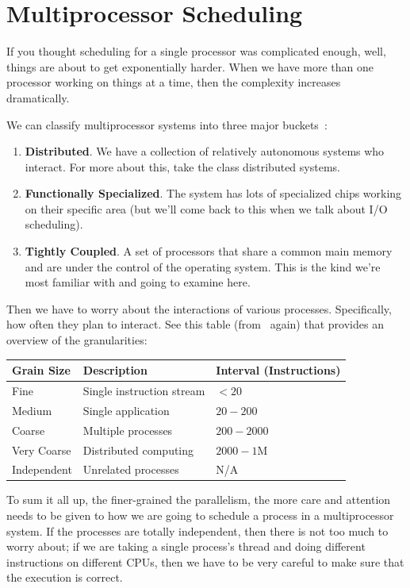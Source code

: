 \section*{Multiprocessor Scheduling}
If you thought scheduling for a single processor was complicated enough, well, things are about to get exponentially harder. When we have more than one processor working on things at a time, then the complexity increases dramatically. 

We can classify multiprocessor systems into three major buckets~\cite{osi}:

\begin{enumerate}
	\item \textbf{Distributed}. We have a collection of relatively autonomous systems who interact. For more about this, take the class distributed systems.
	\item \textbf{Functionally Specialized}. The system has lots of specialized chips working on their specific area (but we'll come back to this when we talk about I/O scheduling).
	\item \textbf{Tightly Coupled}. A set of processors that share a common main memory and are under the control of the operating system. This is the kind we're most familiar with and going to examine here.
\end{enumerate}

Then we have to worry about the interactions of various processes. Specifically, how often they plan to interact. See this table (from~\cite{osi} again) that provides an overview of the granularities:

\begin{center}
\begin{tabular}{l|l|l}
	\textbf{Grain Size} & \textbf{Description} & \textbf{Interval (Instructions)}\\ \hline
	Fine & Single instruction stream & $< 20$ \\\hline
	Medium & Single application & $20 - 200$ \\\hline
	Coarse & Multiple processes & $200 - 2000$ \\\hline
	Very Coarse & Distributed computing & $2000 - 1$M \\\hline
	Independent & Unrelated processes & N/A \\

\end{tabular}
\end{center}

To sum it all up, the finer-grained the parallelism, the more care and attention needs to be given to how we are going to schedule a process in a multiprocessor system. If the processes are totally independent, then there is not too much to worry about; if we are taking a single process's thread and doing different instructions on different CPUs, then we have to be very careful to make sure that the execution is correct.

